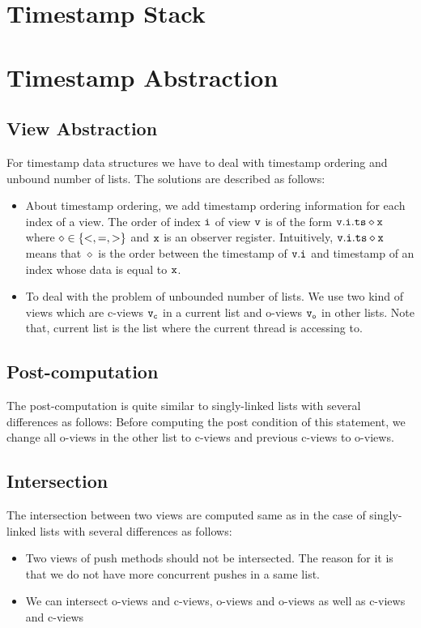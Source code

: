 \section{Timestamp Stack}

\section{Timestamp Abstraction}
\subsection{View Abstraction}
For timestamp data structures we have to deal with timestamp ordering and unbound number of lists. The solutions are described as follows:
\begin{itemize}
	\item  About timestamp ordering, we add timestamp ordering information for each index of a view. The order of index $\tt i$ of view $\tt v$ is of the form $\tt v.i.ts \diamond x$ where $\diamond\in \left\{<,=,>\right\}$ and $\tt x$ is an observer register. Intuitively, $\tt v.i.ts \diamond x$ means that $\diamond$ is the order between the timestamp of $\tt v.i$ and timestamp of an index whose data is equal to $\tt x$. 
	\item To deal with the problem of unbounded number of lists. We use two kind of views which are c-views $\tt v_c$ in a current list and o-views $\tt v_o$ in other lists. Note that, current list is the list where the current thread is accessing to.
\end{itemize}
\subsection{Post-computation}
The post-computation is quite similar to singly-linked lists with several differences as follows: Before computing the post condition of this statement, we change all o-views in the other list to c-views and previous c-views to o-views.  
\subsection{Intersection}
The intersection between two views are computed same as in the case of singly-linked lists with several differences as follows: 
\begin{itemize}
	\item Two views of push methods should not be intersected. The reason for it is that we do not have more concurrent pushes in a same list.
	\item We can intersect o-views and c-views, o-views and o-views as well as c-views and c-views
\end{itemize}








